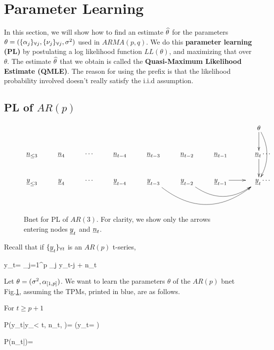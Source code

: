 \section{Parameter Learning}
\label{sec-time-arma-param-learn}

In this section,
we will show
how to find an estimate
${\widehat{\theta}}$
for the parameters
$\theta=(\{\alpha_j\}_{\forall j}, \{\nu_j\}_{\forall j},
\sigma^2)$
used in
$ARMA(p,q)$.
We do this {\bf parameter learning (PL)} by
postulating a  log
 likelihood function
$ LL(\theta)$,
and
maximizing
that over $\theta$.
The estimate ${\widehat{\theta}}$
that we obtain is called
the
{\bf Quasi-Maximum Likelihood Estimate
 (QMLE)}.
The reason for
using the prefix 
is that the likelihood
probability
involved doesn't really satisfy
the i.i.d assumption.

\subsection{\;\;\;PL of $AR(p)$}



\begin{figure}[h!]
$$
\xymatrix{
&&&&&&&\theta\ar[d]\ar@/^1pc/[dd]
\\
\rvn_{\leq 3}
&\rvn_{4}
&\cdots
&\rvn_{t-4}
&\rvn_{t-3}
&\rvn_{t-2}
&\rvn_{t-1}
&\;\;\;\;\rvn_{t}\ar[d]
\cdots
\\
\rvy_{\leq 3}
&\rvy_{4}
&\cdots
&\rvy_{t-4}
&\rvy_{t-3}\ar@/_3pc/[rrr]
&\rvy_{t-2}\ar@/_2pc/[rr]
&\rvy_{t-1}\ar[r]
&\;\;\;\;\rvy_{t}
\cdots
\\
\;
}
$$
\caption{Bnet for
PL of
$AR(3)$.
For clarity,
we show only the
arrows entering nodes $\rvy_t$
and $\rvn_t$.}
\label{fig-qmle-ar-3}
\end{figure}

Recall that if $\tseries{\rvy_t}$
is an  $AR(p)$
t-series,

\beq
y_t=
\sum_{j=1}^p
\alp_j y_{t-j} + n_t
\label{eq-qmle-ar-p-def}
\eeq

Let $\theta=(\sigma^2, \alpha_{[1,p]})$.
We want to learn the parameters
$\theta$ of the $AR(p)$ bnet
Fig.\ref{fig-qmle-ar-3},
assuming the TPMs, printed in blue,
are as follows.


For $t\geq p+1$

\beq\color{blue}
P(y_t|y_{< t}, n_t, \theta)=
\indi\left(y_t=
\right)
\eeq


\beq\color{blue}
P(n_t|\theta)=
{\s\sqrt{2\pi}}
\exp{}
\eeq


